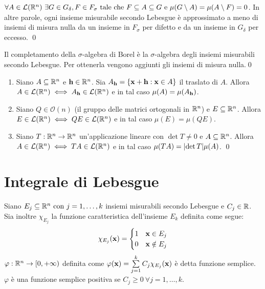 \begin{theorem}
	$\forall A \in \mathcal{L}(\mathbb{R}^n) \ \exists G \in G_\delta, F \in F_\sigma \text{ tale che } F \subseteq A \subseteq G \text{ e } \mu(G\setminus A)=\mu(A\setminus F)=0$. In altre parole, ogni insieme misurabile secondo Lebesgue è approssimato a meno di insiemi di misura nulla da un insieme in $F_\sigma$ per difetto e da un insieme in $G_\delta$ per eccesso.
	\qed
\end{theorem}

\begin{corollary}
	Il completamento della $\sigma$-algebra di Borel è la $\sigma$-algebra degli insiemi misurabili secondo Lebesgue. Per ottenerla vengono aggiunti gli insiemi di misura nulla.\qed
\end{corollary}

\begin{theorem}
	\leavevmode
	\begin{enumerate}
		\item Siano $A\subseteq \mathbb{R}^n$ e $\vb{h} \in \mathbb{R}^n$. Sia $A_{\vb{h}}=\{\vb{x}+\vb{h}:\vb{x}\in A\}$ il traslato di $A$. Allora $A \in \mathcal{L}(\mathbb{R}^n)\iff A_{\vb{h}} \in \mathcal{L}(\mathbb{R}^n)$ e in tal caso $\mu(A)=\mu(A_{\vb{h}})$.
		\item Siano $Q\in \mathcal{O}(n)$ (il gruppo delle matrici ortogonali in $\mathbb{R}^n$) e $E\subseteq \mathbb{R}^n$. Allora $E \in \mathcal{L}(\mathbb{R}^n) \iff QE \in \mathcal{L}(\mathbb{R}^n)$ e in tal caso $\mu(E)=\mu(QE)$.
		\item Siano $T: \mathbb{R}^n \to \mathbb{R}^n$ un'applicazione lineare con $\det T \neq 0$ e $A \subseteq \mathbb{R}^n$. Allora $A \in \mathcal{L}(\mathbb{R}^n) \iff TA \in \mathcal{L}(\mathbb{R}^n)$ e in tal caso $\mu(TA) = \abs{\det T}\mu(A)$.
		\qed
	\end{enumerate}
\end{theorem}

\section{Integrale di Lebesgue}

\begin{definition}
	Siano $E_j \subseteq \mathbb{R}^n \text{ con } j=1,\dots,k$ insiemi misurabili secondo Lebesgue e $C_j \in \mathbb{R}$. Sia inoltre $\chi_{E_j}$ la funzione caratteristica dell'insieme $E_k$ definita come segue:
	$$
		\chi_{E_j}(\vb{x}) =
		\begin{cases}
			1 & \vb{x} \in E_j\\
			0 & \vb{x} \notin E_j
		\end{cases}
	$$
	$\varphi: \mathbb{R}^n \to [0, +\infty)$ definita come $\varphi(\vb{x})=\sum\limits_{j=1}^k C_j \chi_{E_j}(\vb{x})$ è detta funzione semplice. $\varphi$ è una funzione semplice positiva se $C_j \geq 0 \ \forall j=1,\dots,k$.
\end{definition}

